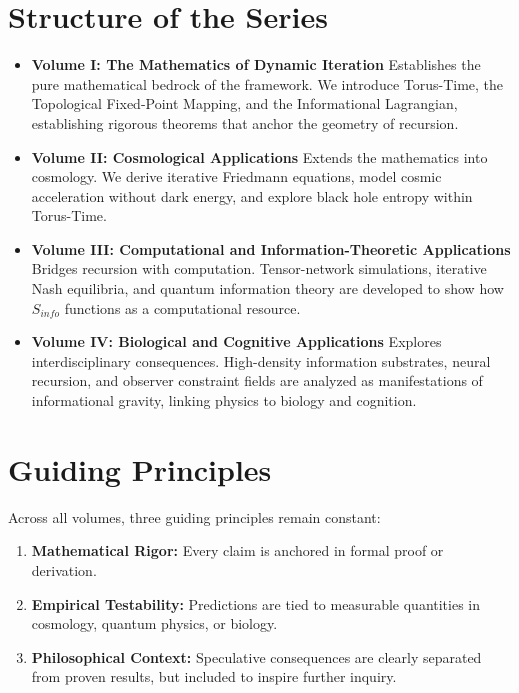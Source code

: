 \documentclass[12pt,openany]{book}
\theoremstyle{plain}
\theoremstyle{definition}
\theoremstyle{remark}
\begin{document}
\section{Structure of the Series}
\begin{itemize}
    \item \textbf{Volume I: The Mathematics of Dynamic Iteration}  
    Establishes the pure mathematical bedrock of the framework. We introduce Torus-Time, 
    the Topological Fixed-Point Mapping, and the Informational Lagrangian, establishing rigorous theorems 
    that anchor the geometry of recursion.
    
    \item \textbf{Volume II: Cosmological Applications}  
    Extends the mathematics into cosmology. We derive iterative Friedmann equations, 
    model cosmic acceleration without dark energy, and explore black hole entropy 
    within Torus-Time.
    
    \item \textbf{Volume III: Computational and Information-Theoretic Applications}  
    Bridges recursion with computation. Tensor-network simulations, iterative Nash equilibria, 
    and quantum information theory are developed to show how $S_{info}$ functions as a 
    computational resource.
    
    \item \textbf{Volume IV: Biological and Cognitive Applications}  
    Explores interdisciplinary consequences. High-density information substrates, neural recursion, and observer 
    constraint fields are analyzed as manifestations of informational gravity, linking 
    physics to biology and cognition.
\end{itemize}

\section{Guiding Principles}
Across all volumes, three guiding principles remain constant:
\begin{enumerate}
    \item \textbf{Mathematical Rigor:} Every claim is anchored in formal proof or derivation.
    \item \textbf{Empirical Testability:} Predictions are tied to measurable quantities 
    in cosmology, quantum physics, or biology.
    \item \textbf{Philosophical Context:} Speculative consequences are clearly separated 
    from proven results, but included to inspire further inquiry.
\end{enumerate}
\end{document}
